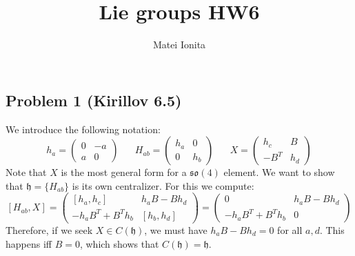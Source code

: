 \documentclass[12 pt]{article}
\title{Lie groups HW6}
\author{Matei Ionita}
\newcommand{\fr}{\mathfrak}
\begin{document}
  \maketitle

\subsection*{Problem 1 (Kirillov 6.5)}
We introduce the following notation:
\[       h_a = \left(  \begin{array} {cc}  0 & -a \\ a & 0  \end{array} \right)   \;\;\;\;\;\;    H_{ab} = \left(  \begin{array} {cc}  h_a & 0 \\ 0 & h_b  \end{array} \right)   \;\;\;\;\;\; X  = \left(  \begin{array} {cc}  h_c & B \\ -B^T & h_d  \end{array} \right)  \]
Note that $X$ is the most general form for a $\fr{so}(4)$ element. We want to show that $\fr{h} = \{ H_{ab} \}$ is its own centralizer. For this we compute:
\[           [ H_{ab} , X ] = \left(   \begin{array} {cc}  [h_a, h_c] & h_a B - B h_d \\ - h_a B^T + B^T h_b & [h_b, h_d]  \end{array} \right)      =  \left( \begin{array} {cc}  0 & h_a B - B h_d \\ - h_a B^T + B^T h_b & 0  \end{array}  \right)   \]
Therefore, if we seek $X \in C(\fr h)$, we must have $h_a B - B h_d = 0$ for all $a, d$. This happens iff $B = 0$, which shows that $C(\fr h) = \fr h$.
\end{document}
